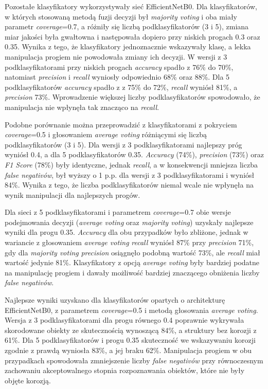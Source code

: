\documentclass[polish,12pt]{aghthesis}
\begin{document}
Pozostałe klasyfikatory wykorzystywały sieć EfficientNetB0. Dla klasyfikatorów, w których stosowaną metodą fuzji decyzji był \textit{majority voting} i oba miały parametr \textit{coverage}=0.7, a różniły się liczbą podklasyfikatorów (3 i 5), zmiana miar jakości była gwałtowna i następowała dopiero przy niskich progach 0.3 oraz 0.35. Wynika z tego, że klasyfikatory jednoznacznie wskazywały klasę, a lekka manipulacja progiem nie powodowała zmiany ich decyzji. W wersji z 3 podklasyfikatorami przy niskich progach \textit{accuracy} spadło z 76\% do 70\%, natomiast \textit{precision} i \textit{recall} wyniosły odpowiednio 68\% oraz 88\%. Dla 5 podklasyfikatorów \textit{accuracy} spadło z z 75\% do 72\%, \textit{recall} wyniósł 81\%, a \textit{precision} 73\%. Wprowadzenie większej liczby podklasyfikatorów spowodowało, że manipulacja nie wpłynęła tak znacząco na \textit{recall}. 

Podobne porównanie można przeprowadzić z klasyfikatorami z pokryciem \textit{coverage}=0.5 i głosowaniem \textit{average voting} różniącymi się liczbą podklasyfikatorów (3 i 5). Dla wersji z 3 podklasyfikatorami najlepszy próg wyniósł 0.4, a dla 5 podklasyfikatorów 0.35. \textit{Accuracy} (74\%), \textit{precision} (73\%) oraz \textit{F1 Score} (78\%) były identyczne, jednak \textit{recall}, a w konsekwencji mniejsza liczba \textit{false negativów}, był wyższy o 1 p.p. dla wersji z 3 podklasyfikatorami i wyniósł 84\%. Wynika z tego, że liczba podklasyfikatorów niemal wcale nie wpłynęła na wynik manipulacji dla najlepszych progów.

Dla sieci z 5 podklasyfikatorami i parametrem \textit{coverage}=0.7 obie wersje podejmowania decyzji (\textit{average voting} oraz \textit{majority voting}) uzyskały najlepsze wyniki dla progu 0.35. \textit{Accuracy} dla obu przypadków było zbliżone, jednak w wariancie z głosowaniem \textit{average voting} \textit{recall} wyniósł 87\% przy \textit{precision} 71\%, gdy dla \textit{majority voting} \textit{precision} osiągnęło podobną wartość 73\%, ale \textit{recall} miał wartość jedynie 81\%. Klasyfikatory z opcją \textit{average voting} były bardziej podatne na manipulację progiem i dawały możliwość bardziej znaczącego obniżenia liczby \textit{false negativów}.

Najlepsze wyniki uzyskano dla klasyfikatorów opartych o architekturę EfficientNetB0, z parametrem \textit{coverage}=0.5 i metodą głosowania \textit{average voting}. Wersja z 3 podklasyfikatorami dla progu równego 0.4 poprawnie wykrywała skorodowane obiekty ze skutecznością wynoszącą 84\%, a struktury bez korozji z 61\%. Dla 5 podklasyfikatorów i progu 0.35 skuteczność we wskazywaniu korozji zgodnie z prawdą wyniosła 83\%, a jej braku 62\%. Manipulacja progiem w obu przypadkach spowodowała zmniejszenie liczby \textit{false negativów} przy równoczesnym zachowaniu akceptowalnego stopnia rozpoznawania obiektów, które nie były objęte korozją. 
\end{document}
